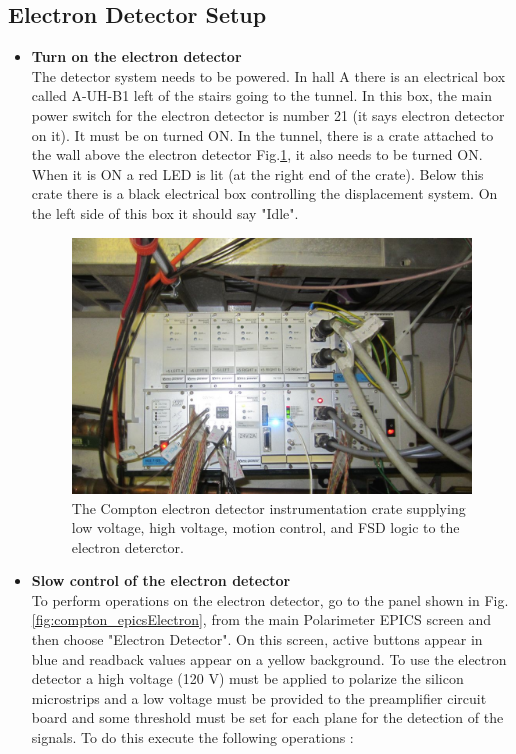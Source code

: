 \subsection{Electron Detector Setup}
\begin{itemize}
\item {\bf Turn on the electron detector}\\
        The detector system needs to be powered. In hall A there is an
        electrical box called A-UH-B1 left of the stairs going to the tunnel. 
        In this box, the main power switch for the electron detector is number 21 (it says electron
        detector on it). It must be on turned ON. In the tunnel,
        there is a crate attached to the wall above the electron detector Fig.\ref{fig:compton_edet_crate}, it also needs to be turned ON.
        When it is ON a red LED is lit (at the right end of the crate). Below this crate there is a black electrical
        box controlling the displacement system. On the left side of this box it should say "Idle".

 \begin{figure}[htp]
    \begin{center}
        \includegraphics*[angle=0,scale=0.4]{compton_edet_crate}
    \end{center}
    \caption[compton:electron detector crate]{
            The Compton electron detector instrumentation crate supplying low voltage, high voltage, motion control, and FSD logic to the electron deterctor.}
    \label{fig:compton_edet_crate}
 \end{figure}

\item {\bf Slow control of the electron detector }\\
To perform operations on the electron detector, go to the panel shown in Fig.\ref{fig:compton_epicsElectron}, from the main Polarimeter EPICS screen
and then choose "Electron Detector". On this screen, 
 active buttons appear in blue
and readback values appear on a yellow background. 
To use the electron detector a high voltage
(120 V) must be applied to polarize the silicon
microstrips and a low voltage must be provided to the preamplifier
circuit board and some threshold must be set for each plane for
the detection of the signals. To do this execute the following operations :


\end{itemize}
